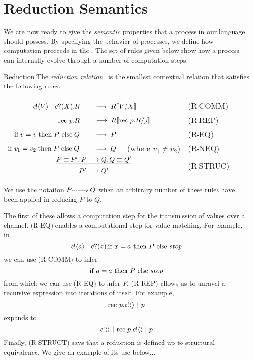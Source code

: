 \section{Reduction Semantics}\label{secreducationsemantics}
We are now ready to give the \emph{semantic} properties that a process in our language should possess.  
By specifying the behavior of processes, we define how computation proceeds in the \picalc.  
The set of rules given below show how a process can internally evolve through a number of computation steps.
\begin{definition}{Reduction}
	The \emph{reduction relation} \pred\ is the smallest contextual relation that satisfies the following rules:
	\begin{center}\begin{tabular}{rll}
		${c}!\langle{ \ensuremath{\overline{V}} }\rangle \ |\  {c}?({\overline{X}}).R$\ &\  $\longrightarrow\  R\llbracket{ \ensuremath{\overline{V}} }/{\overline{X}}\rrbracket$ & \tiny{(R-COMM)}\\
		$\text{rec }{p}.R$\ &\  $\longrightarrow\  R\llbracket{ \ensuremath{\text{rec }{p}.} R}/{p}\rrbracket$ & \tiny{(R-REP)}\\
		$\text{if } {v = v}\text{ then } P \text{ else } Q$\ &\ $\pred\ P$ & \tiny{(R-EQ)}\\
		$\text{if } {v_1 = v_2}\text{ then } P \text{ else } Q$\ &\ $\pred\ Q$ \ \ (where $v_1\neq v_2$)& \tiny{(R-NEQ)}\\
		\multicolumn{2}{c}{\hspace{4.5em}$\underline{P\equiv P', P \longrightarrow Q, Q\equiv Q'}$} & \multirow{2}{*}{\tiny{(R-STRUC)}}\\
		\multicolumn{2}{c}{\hspace{4.5em}$P'\longrightarrow Q'$}
	\end{tabular}\end{center}
	We use the notation $P\cdotp\!\cdotp\!\cdotp\!\longrightarrow Q$ when an arbitrary number of these rules have been applied in reducing $P$ to $Q$.
\end{definition}
The first of these allows a computation step for the transmission of values over a channel.  
(R-EQ) enables a computational step for value-matching.  For example, in
\[
	{c}!\langle{a}\rangle \ |\  {c}?({x}). \text{if } {x=a} \text{ then } P \text{ else } stop  
\]
we can use (R-COMM) to infer
\[
	\text{if } {a=a} \text{ then } P \text{ else } stop  
\]
from which we can use (R-EQ) to infer $P$.
(R-REP) allows us to unravel a recursive expression into iterations of itself.  For example,
\[
	\text{rec }{p}. {c}!\langle{}\rangle \ |\  p
\]
expands to
\[
	{c}!\langle{}\rangle \ |\  \text{rec }{p}. {c}!\langle{}\rangle \ |\  p
\]
Finally, (R-STRUCT) says that a reduction is defined up to structural equivalence.  We give an example of its use below...
